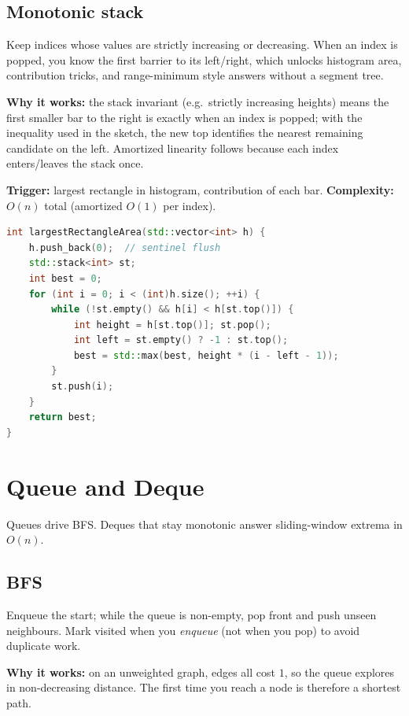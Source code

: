 \subsection{Monotonic stack}
\label{subsec:pat-mono-stack}
Keep indices whose values are strictly increasing or decreasing. When an index
is popped, you know the first barrier to its left/right, which unlocks histogram
area, contribution tricks, and range-minimum style answers without a segment tree.

\par\noindent\textbf{Why it works:} the stack invariant (e.g.\ strictly increasing
heights) means the first smaller bar to the right is exactly when an index is
popped; with the inequality used in the sketch, the new top identifies the
nearest remaining candidate on the left. Amortized
linearity follows because each index enters/leaves the stack once.

\textbf{Trigger:} largest rectangle in histogram, contribution of each bar.
\newline
\textbf{Complexity:} $O(n)$ total (amortized $O(1)$ per index).

\begin{lstlisting}[language=C++]
int largestRectangleArea(std::vector<int> h) {
    h.push_back(0);  // sentinel flush
    std::stack<int> st;
    int best = 0;
    for (int i = 0; i < (int)h.size(); ++i) {
        while (!st.empty() && h[i] < h[st.top()]) {
            int height = h[st.top()]; st.pop();
            int left = st.empty() ? -1 : st.top();
            best = std::max(best, height * (i - left - 1));
        }
        st.push(i);
    }
    return best;
}
\end{lstlisting}

\section{Queue and Deque}
\label{sec:pat-queue-deque}
Queues drive BFS. Deques that stay monotonic answer sliding-window extrema in $O(n)$.

\subsection{BFS}
\label{subsec:pat-bfs-queue}
Enqueue the start; while the queue is non-empty, pop front and push unseen
neighbours. Mark visited when you \emph{enqueue} (not when you pop) to avoid
duplicate work.

\par\noindent\textbf{Why it works:} on an unweighted graph, edges all cost $1$,
so the queue explores in non-decreasing distance. The first time you reach a
node is therefore a shortest path.

